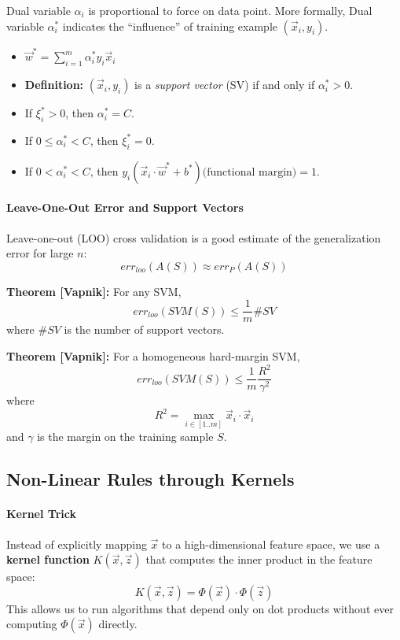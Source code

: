 Dual variable $\alpha_i$ is proportional to force on data point.
More formally, Dual variable $\alpha_i^*$ indicates the ``influence'' of training example $(\vec{x}_i, y_i)$.

\begin{itemize}
    \item $\vec{w}^* = \sum_{i=1}^m \alpha_i^* y_i \vec{x}_i$
    \item \textbf{Definition:} $(\vec{x}_i, y_i)$ is a \textit{support vector} (SV) if and only if $\alpha_i^* > 0$.
    \item If $\xi_i^* > 0$, then $\alpha_i^* = C$.
    \item If $0 \leq \alpha_i^* < C$, then $\xi_i^* = 0$.
    \item If $0 < \alpha_i^* < C$, then $y_i \left( \vec{x}_i \cdot \vec{w}^* + b^* \right) \text{(functional margin)} = 1$.
\end{itemize}

\paragraph{Leave-One-Out Error and Support Vectors}

Leave-one-out (LOO) cross validation is a good estimate of the generalization error for large $n$:
\[
    err_{loo}(A(S)) \approx err_P(A(S))
\]

\textbf{Theorem [Vapnik]:} For any SVM,
\[
    err_{loo}(SVM(S)) \leq \frac{1}{m} \#SV
\]
where $\#SV$ is the number of support vectors.

\textbf{Theorem [Vapnik]:} For a homogeneous hard-margin SVM,
\[
    err_{loo}(SVM(S)) \leq \frac{1}{m} \frac{R^2}{\gamma^2}
\]
where
\[
    R^2 = \max_{i \in [1..m]} \vec{x}_i \cdot \vec{x}_i
\]
and $\gamma$ is the margin on the training sample $S$.

\subsection{Non-Linear Rules through Kernels}

\paragraph{Kernel Trick}

Instead of explicitly mapping $\vec{x}$ to a high-dimensional feature space, we use a \textbf{kernel function} $K(\vec{x}, \vec{z})$ that computes the inner product in the feature space:
\[
    K(\vec{x}, \vec{z}) = \Phi(\vec{x}) \cdot \Phi(\vec{z})
\]
This allows us to run algorithms that depend only on dot products without ever computing $\Phi(\vec{x})$ directly.

